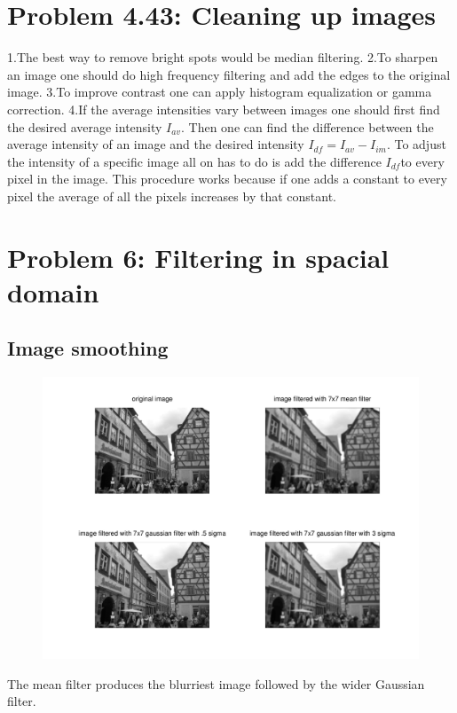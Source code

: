 \documentclass{article}
\begin{document}
	\newpage
	\section{Problem 4.43: Cleaning up images}
	1.The best way to remove bright spots would be median filtering.
	\newline
	2.To sharpen an image one should do high frequency filtering and add the edges to the original image.
	\newline
	3.To improve contrast one can apply histogram equalization or gamma correction.
	\newline
	4.If the average intensities vary between images one should first find the desired average intensity \(I_{av}\). Then one can find the difference between the average intensity of an image and the desired intensity \(I_{df} = I_{av}-I_{im}\). To adjust the intensity of a specific image all on has to do is add the difference \(I_{df}\)to every pixel in the image. This procedure works because if one adds a constant to every pixel the average of all the pixels increases by that constant.
	
	\newpage
	\section{Problem 6: Filtering in spacial domain}
	\subsection{Image smoothing}
	\begin{figure}[H]
		\includegraphics[width=\linewidth]{Q6/partA.png}
	\end{figure}
	The mean filter produces the blurriest image followed by the wider Gaussian filter.
\end{document}
